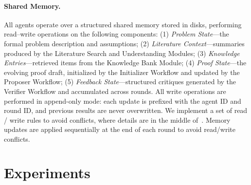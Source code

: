 \documentclass{article}
\begin{document}
\paragraph{Shared Memory.}
All agents operate over a structured shared memory stored in disks, performing read–write operations on the following components:
(1) \emph{Problem State}—the formal problem description and assumptions;
(2) \emph{Literature Context}—summaries produced by the Literature Search and Understanding Modules;
(3) \emph{Knowledge Entries}—retrieved items from the Knowledge Bank Module;
(4) \emph{Proof State}—the evolving proof draft, initialized by the Initializer Workflow and updated by the Proposer Workflow;
(5) \emph{Feedback State}—structured critiques generated by the Verifier Workflow and accumulated across rounds. All write operations are performed in append-only mode: each update is prefixed with the agent ID and round ID, and previous results are never overwritten. We implement a set of read / write rules to avoid conflicts, where details are in the middle of~. Memory updates are applied sequentially at the end of each round to avoid read/write conflicts.

\vspace{-7pt}
\section{Experiments}
\label{sec-experiments}
\end{document}
